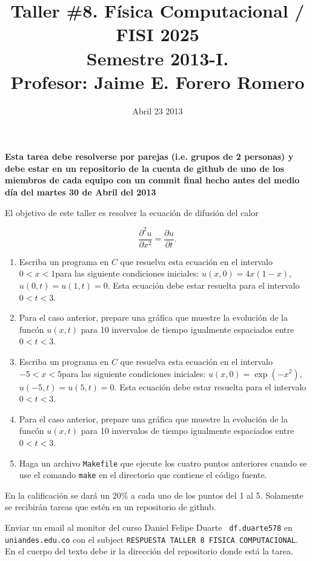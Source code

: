 \documentclass{article}
\title{Taller \#8. F\'isica Computacional / FISI 2025 \\Semestre
  2013-I. \\ Profesor: Jaime E. Forero Romero}
\date{Abril 23 2013}
\begin{document}
\maketitle

{\bf Esta tarea debe resolverse por parejas (i.e. grupos de 2
  personas) y debe estar en un repositorio de la cuenta de github de
  uno de los miembros de cada equipo con un commit final hecho antes del
  medio d\'ia del martes 30 de Abril del 2013}  

El objetivo de este taller es resolver la ecuaci\'on de difusi\'on del calor

\begin{equation}
\frac{\partial^2u}{\partial x^2} = \frac{\partial u}{\partial t}.
\end{equation}

\begin{enumerate}

\item 
Escriba un programa en $C$ que resuelva esta ecuaci\'on en el intervalo $0<x<1$para las siguiente condiciones iniciales: $u(x,0) = 4x(1-x)$, $u(0,t)= u(1,t)=0$. Esta ecuaci\'on debe estar resuelta para el intervalo $0<t<3$.


\item
Para el caso anterior, prepare una gr\'afica que muestre la evoluci\'on de la func\'on $u(x,t)$ para 10 invervalos de tiempo igualmente espaciados entre $0<t<3$.


\item 

Escriba un programa en $C$ que resuelva esta ecuaci\'on en el intervalo $-5<x<5$para las siguiente condiciones iniciales: $u(x,0) = \exp(-x^2)$, $u(-5,t)= u(5,t)=0$. Esta ecuaci\'on debe estar resuelta para el intervalo $0<t<3$.

\item
Para el caso anterior, prepare una gr\'afica que muestre la evoluci\'on de la func\'on $u(x,t)$ para 10 invervalos de tiempo igualmente espaciados entre $0<t<3$.

\item 
Haga un archivo \verb"Makefile" que ejecute los cuatro puntos anteriores
cuando se use el comando \verb"make" en el directorio que contiene el
c\'odigo fuente.   
\end{enumerate}

En la calificaci\'on se dar\'a un 20\% a cada uno de los puntos del 1
al 5. Solamente se recibir\'an tareas que est\'en en un repositorio de
github. 

Enviar un email al monitor del curso Daniel Felipe Duarte {\tt
  df.duarte578} en {\tt uniandes.edu.co} con el subject
\verb"RESPUESTA TALLER 8 FISICA COMPUTACIONAL". En el cuerpo del texto
debe ir la direcci\'on del repositorio donde est\'a la tarea. 
\end{document}
